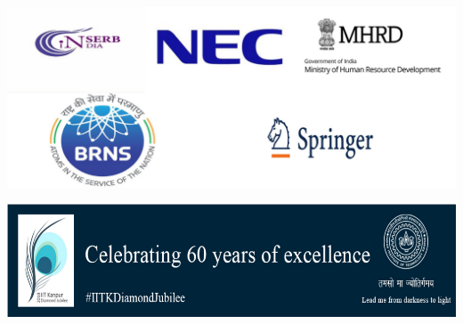 



\vfill

\begin{center}
\includegraphics[width=\textwidth]{images/logos/sponsors1.png}

\vfill

\includegraphics[width=\textwidth]{images/logos/diamondJubilee.png}
\end{center}